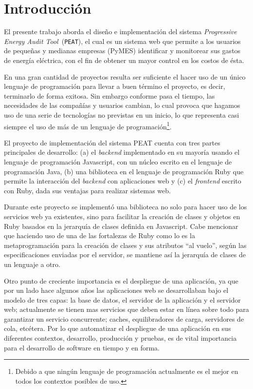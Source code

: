 \chapter*{Introducción}
El presente trabajo aborda el diseño e implementación del sistema \textit{Progressive
  Energy Audit Tool}\ (\texttt{PEAT}), el cual es un sistema web que permite
a los usuarios de pequeñas y medianas empresas (PyMES) identificar y monitorear
sus gastos de energía eléctrica, con el fin de obtener un mayor control
en los costos de ésta.

En una gran cantidad de proyectos resulta ser suficiente el hacer uso de un
único lenguaje de programación para llevar a buen término el proyecto, es decir,
terminarlo de forma exitosa. Sin embargo conforme pasa el tiempo, las necesidades
de las compañías y usuarios cambian, lo cual provoca que hagamos uso de una serie de
tecnologías no previstas en un inicio, lo que representa casi siempre el uso
de más de un lenguaje de programación\footnote{Debido a que ningún
lenguaje de programación actualmente es el mejor en todos los contextos
posibles de uso.}.

El proyecto de implementación del sistema PEAT cuenta con tres partes principales
de desarrollo: (a) el \textit{backend}  implementado en su mayoría usando
el lenguaje de programación Javascript, con un núcleo escrito en el lenguaje de
programación Java, (b) una biblioteca en el lenguaje de programación Ruby que permite
la interacción del \textit{backend} con aplicaciones web y (c) el \textit{frontend}
escrito con Ruby, dada sus ventajas para realizar sistemas web.

Durante este proyecto se implementó una biblioteca no solo para hacer uso de
los servicios web ya existentes, sino para facilitar la creación
de clases y objetos en Ruby basados en la jerarquía de clases definida
en Javascript. Cabe mencionar que haciendo uso de una de las fortalezas de Ruby
como lo es la metaprogramación para la creación de clases y sus
atributos ``al vuelo'', según las especificaciones enviadas por el servidor,
se mantiene así la jerarquía de clases de un lenguaje a otro.

Otro punto de creciente importancia es el despliegue de una aplicación, ya que por un
lado hace algunos años las aplicaciones web se desarrollaban bajo el modelo de
tres capas: la base de datos, el servidor de la aplicación y el servidor web;
actualmente se tienen mas servicios que deben estar en línea sobre todo para
garantizar un servicio concurrente; caches, equilibradores de carga, servidores
de cola, etcétera. Por lo que automatizar el despliegue de una aplicación en sus
diferentes contextos, desarrollo, producción y pruebas, es de vital importancia
para el desarrollo de software en tiempo y en forma.

